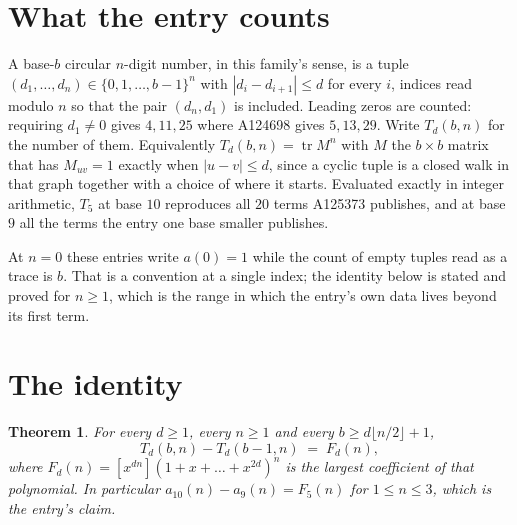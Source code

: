 \documentclass[11pt,a4paper]{article}
\theoremstyle{plain}
\newtheorem{theorem}{Theorem}
\theoremstyle{definition}
\begin{document}
\section{What the entry counts}

A base-$b$ circular $n$-digit number, in this family's sense, is a tuple
$(d_1,\dots,d_n)\in\{0,1,\dots,b-1\}^{n}$ with $|d_i-d_{i+1}|\le d$ for every $i$, indices
read modulo $n$ so that the pair $(d_n,d_1)$ is included. Leading zeros are counted: requiring
$d_1\ne0$ gives $4,11,25$ where A124698 gives $5,13,29$. Write $T_d(b,n)$ for the number of
them. Equivalently $T_d(b,n)=\operatorname{tr}M^{n}$ with $M$ the $b\times b$ matrix that has
$M_{uv}=1$ exactly when $|u-v|\le d$, since a cyclic tuple is a closed walk in that graph
together with a choice of where it starts. Evaluated exactly in integer arithmetic, $T_{5}$
at base $10$ reproduces all $20$ terms A125373 publishes, and at base $9$ all the
terms the entry one base smaller publishes.

At $n=0$ these entries write $a(0)=1$ while the count of empty tuples read as a trace is $b$.
That is a convention at a single index; the identity below is stated and proved for $n\ge1$,
which is the range in which the entry's own data lives beyond its first term.

\section{The identity}

\begin{theorem}
For every $d\ge1$, every $n\ge1$ and every $b\ge d\lfloor n/2\rfloor+1$,
\[
T_d(b,n)-T_d(b-1,n)\;=\;F_d(n),
\]
where $F_d(n)=[x^{dn}](1+x+\dots+x^{2d})^{n}$ is the largest coefficient of that
polynomial. In particular $a_{10}(n)-a_{9}(n)=F_{5}(n)$ for $1\le n\le3$, which
is the entry's claim.
\end{theorem}
\end{document}
